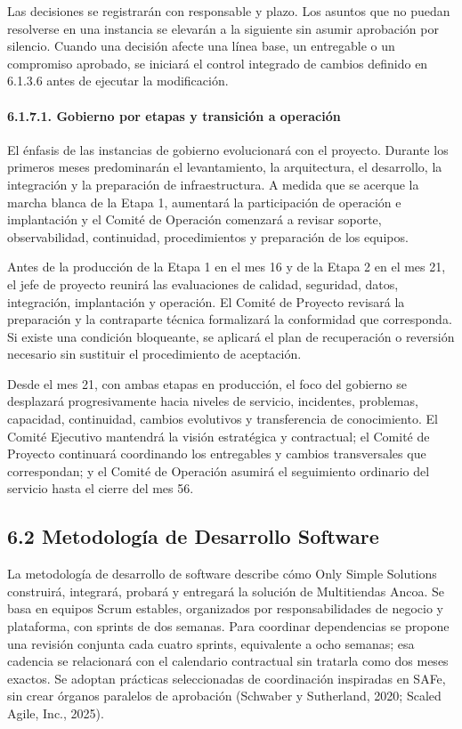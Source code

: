 \documentclass[11pt]{article}
\begin{document}
Las decisiones se registrarán con responsable y plazo. Los asuntos que
no puedan resolverse en una instancia se elevarán a la siguiente sin
asumir aprobación por silencio. Cuando una decisión afecte una línea
base, un entregable o un compromiso aprobado, se iniciará el control
integrado de cambios definido en 6.1.3.6 antes de ejecutar la
modificación.

\paragraph{6.1.7.1. Gobierno por etapas y transición a operación}\label{6-1-7-1-gobierno-por-etapas-y-transicion-a-operacion}

El énfasis de las instancias de gobierno evolucionará con el proyecto. Durante los primeros meses predominarán el levantamiento, la arquitectura, el desarrollo, la integración y la preparación de infraestructura. A medida que se acerque la marcha blanca de la Etapa 1, aumentará la participación de operación e implantación y el Comité de Operación comenzará a revisar soporte, observabilidad, continuidad, procedimientos y preparación de los equipos.

Antes de la producción de la Etapa 1 en el mes 16 y de la Etapa 2 en el
mes 21, el jefe de proyecto reunirá las evaluaciones de calidad,
seguridad, datos, integración, implantación y operación. El Comité de
Proyecto revisará la preparación y la contraparte técnica formalizará la
conformidad que corresponda. Si existe una condición bloqueante, se
aplicará el plan de recuperación o reversión necesario sin sustituir el
procedimiento de aceptación.

Desde el mes 21, con ambas etapas en producción, el foco del gobierno se
desplazará progresivamente hacia niveles de servicio, incidentes,
problemas, capacidad, continuidad, cambios evolutivos y transferencia de
conocimiento. El Comité Ejecutivo mantendrá la visión estratégica y
contractual; el Comité de Proyecto continuará coordinando los
entregables y cambios transversales que correspondan; y el Comité de
Operación asumirá el seguimiento ordinario del servicio hasta el cierre
del mes 56.

\subsection{6.2 Metodología de Desarrollo Software}\label{6-2-metodologia-de-desarrollo-software}

La metodología de desarrollo de software describe cómo Only Simple
Solutions construirá, integrará, probará y entregará la solución de
Multitiendas Ancoa. Se basa en equipos Scrum estables, organizados por
responsabilidades de negocio y plataforma, con sprints de dos semanas.
Para coordinar dependencias se propone una revisión conjunta cada cuatro
sprints, equivalente a ocho semanas; esa cadencia se relacionará con el
calendario contractual sin tratarla como dos meses exactos. Se adoptan
prácticas seleccionadas de coordinación inspiradas en SAFe, sin crear
órganos paralelos de aprobación (Schwaber y Sutherland, 2020; Scaled
Agile, Inc., 2025).
\end{document}
